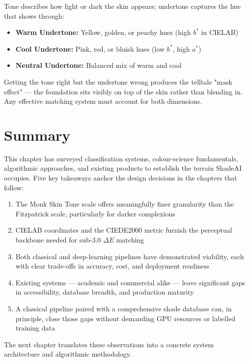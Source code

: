 Tone describes how light or dark the skin appears; undertone captures the hue that shows through:

\begin{itemize}
    \item \textbf{Warm Undertone:} Yellow, golden, or peachy hues (high $b^*$ in CIELAB)
    \item \textbf{Cool Undertone:} Pink, red, or bluish hues (low $b^*$, high $a^*$)
    \item \textbf{Neutral Undertone:} Balanced mix of warm and cool
\end{itemize}

Getting the tone right but the undertone wrong produces the telltale "mask effect" — the foundation sits visibly on top of the skin rather than blending in. Any effective matching system must account for both dimensions.

\section{Summary}

This chapter has surveyed classification systems, colour-science fundamentals, algorithmic approaches, and existing products to establish the terrain ShadeAI occupies. Five key takeaways anchor the design decisions in the chapters that follow:

\begin{enumerate}
    \item The Monk Skin Tone scale offers meaningfully finer granularity than the Fitzpatrick scale, particularly for darker complexions
    \item CIELAB coordinates and the CIEDE2000 metric furnish the perceptual backbone needed for sub-3.0 $\Delta E$ matching
    \item Both classical and deep-learning pipelines have demonstrated viability, each with clear trade-offs in accuracy, cost, and deployment readiness
    \item Existing systems — academic and commercial alike — leave significant gaps in accessibility, database breadth, and production maturity
    \item A classical pipeline paired with a comprehensive shade database can, in principle, close those gaps without demanding GPU resources or labelled training data
\end{enumerate}

The next chapter translates these observations into a concrete system architecture and algorithmic methodology.
